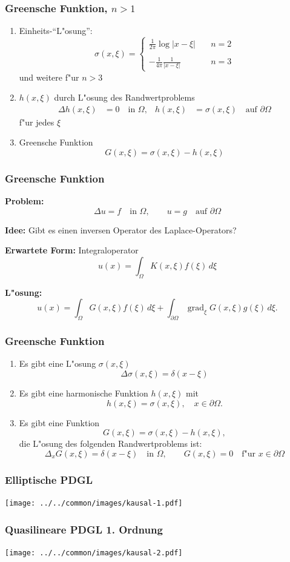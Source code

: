 \begin{frame}
\frametitle{Greensche Funktion, $n>1$}
\begin{enumerate}[<+->]
\item
Einheits-``L"osung'':
\[
\sigma(x,\xi) = \begin{cases}
\displaystyle\frac1{2\pi}\log|x-\xi|\quad&n=2\\
\\
\displaystyle-\frac1{4\pi}\frac{1}{|x-\xi|}\quad&n=3
\end{cases}
\]
und weitere f"ur $n>3$
\item
$h(x,\xi)$ durch L"osung des Randwertproblems
\begin{align*}
\Delta h(x,\xi)&= 0\quad\text{in $\Omega$},&h(x,\xi)&=\sigma(x,\xi)\quad\text{auf $\partial\Omega$}
\end{align*}
f"ur jedes $\xi$
\item Greensche Funktion
\[
G(x,\xi)=\sigma(x,\xi)-h(x,\xi)
\]
\end{enumerate}
\end{frame}


\begin{frame}
\frametitle{Greensche Funktion}
{\bf Problem:}
\[
\Delta u=f\quad\text{in $\Omega$},\qquad u=g\quad\text{auf $\partial\Omega$}
\]
\medskip

{\bf Idee:} Gibt es einen inversen Operator des Laplace-Operators?
\medskip

\pause
{\bf Erwartete Form:} Integraloperator
\[
u(x)=\int_\Omega K(x,\xi)f(\xi)\,d\xi
\]

\pause
{\bf L"osung:}
\[
u(x)
=
\int_{\Omega} G(x,\xi)f(\xi)\,d\xi
+
\int_{\partial\Omega}  \operatorname{grad}_\xi G(x,\xi) g(\xi)\,d\xi.
\]

\end{frame}

\begin{frame}
\frametitle{Greensche Funktion}

\begin{enumerate}[<+->]
\item
Es gibt eine L"osung $\sigma(x,\xi)$
\[
\Delta \sigma (x,\xi)=\delta(x-\xi)
\]
\item 
Es gibt eine harmonische Funktion $h(x,\xi)$ mit
\[
h(x,\xi)=\sigma(x,\xi),\quad x\in\partial\Omega.
\]
\item
Es gibt eine Funktion
\[
G(x,\xi) = \sigma(x,\xi)-h(x,\xi),
\]
die L"osung des folgenden Randwertproblems ist:
\[
\Delta_x G(x,\xi) = \delta(x-\xi)\quad\text{in $\Omega$},
\qquad
G(x,\xi)=0\quad\text{f"ur $x\in\partial\Omega$}
\]
\end{enumerate}
\end{frame}

\begin{frame}
\frametitle{Elliptische PDGL}
\begin{center}
\texttt{[image: ../../common/images/kausal-1.pdf]}
\end{center}
\end{frame}

\begin{frame}
\frametitle{Quasilineare PDGL 1. Ordnung}
\begin{center}
\texttt{[image: ../../common/images/kausal-2.pdf]}
\end{center}
\end{frame}

